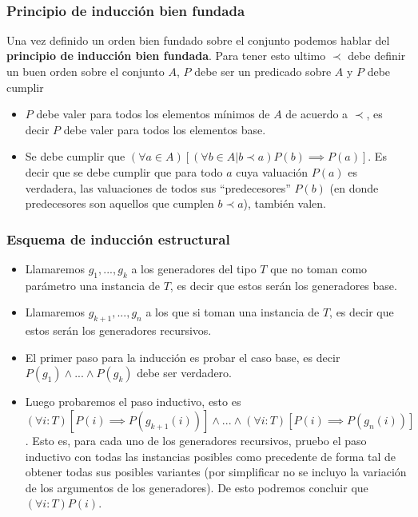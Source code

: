 ~

\subsubsection{Principio de inducci\'on bien fundada}

Una vez definido un orden bien fundado sobre el conjunto podemos hablar del \textbf{principio de inducci\'on bien fundada}. Para tener esto ultimo $\prec$ debe definir un buen orden sobre el conjunto $A$, $P$ debe ser un predicado sobre $A$ y $P$ debe cumplir

\begin{itemize}
 \item $P$ debe valer para todos los elementos m\'inimos de $A$ de acuerdo a $\prec$, es decir $P$ debe valer para todos los elementos base.
 \item Se debe cumplir que $(\forall a\in A)[(\forall b \in A | b \prec a) P(b) \implies P(a)]$. Es decir que se debe cumplir que para todo $a$ cuya valuaci\'on $P(a)$ es verdadera, las valuaciones de todos sus ``predecesores'' $P(b)$ (en donde predecesores son aquellos que cumplen $b \prec a$), tambi\'en valen.
\end{itemize}


\subsubsection{Esquema de inducci\'on estructural}

\begin{itemize}
 \item Llamaremos $g_1,...,g_k$ a los generadores del tipo $T$ que no toman como par\'ametro una instancia de $T$, es decir que estos ser\'an los generadores base.
 \item Llamaremos $g_{k+1},...,g_n$ a los que si toman una instancia de $T$, es decir que estos ser\'an los generadores recursivos.
 \item El primer paso para la inducci\'on es probar el caso base, es decir $P(g_1) \land ... \land P(g_k)$ debe ser verdadero.
 \item Luego probaremos el paso inductivo, esto es $(\forall i : T) [P(i) \implies P(g_{k+1}(i))] \land ... \land (\forall i : T) [P(i) \implies P(g_{n}(i))]$. Esto es, para cada uno de los generadores recursivos, pruebo el paso inductivo con todas las instancias posibles como precedente de forma tal de obtener todas sus posibles variantes (por simplificar no se incluyo la variaci\'on de los argumentos de los generadores). De esto podremos concluir que $(\forall i : T) P(i)$.
\end{itemize}